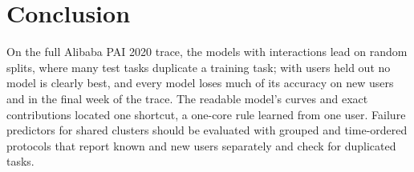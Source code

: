\section{Conclusion}
\label{sec:conclusion}

On the full Alibaba PAI 2020 trace, the models with interactions lead on random splits, where many test tasks duplicate a training task; with users held out no model is clearly best, and every model loses much of its accuracy on new users and in the final week of the trace. The readable model's curves and exact contributions located one shortcut, a one-core rule learned from one user. Failure predictors for shared clusters should be evaluated with grouped and time-ordered protocols that report known and new users separately and check for duplicated tasks.

